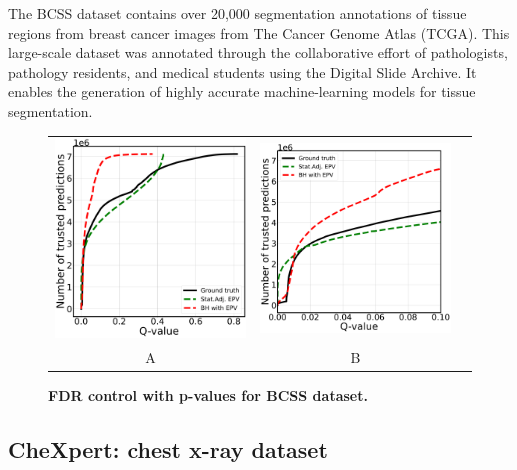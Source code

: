 \documentclass{article}
\begin{document}
The BCSS dataset contains over 20,000 segmentation annotations of tissue regions from breast cancer images from The Cancer Genome Atlas (TCGA). This large-scale dataset was annotated through the collaborative effort of pathologists, pathology residents, and medical students using the Digital Slide Archive. It enables the generation of highly accurate machine-learning models for tissue segmentation.


\begin{figure}
	\centering
	\begin{tabular}{ccc}
 		\includegraphics[width=2in]{img/cnn_multi_sa_bcss_fdr_control.pdf} &
		\includegraphics[width=2in]{img/cnn_multi_sa_bcss_fdr_control_loc.pdf}  \\
		A & B 
	\end{tabular}
	\caption{\bf FDR control with p-values for BCSS dataset.}
	\label{fig:bcss}
\end{figure}



\subsection{CheXpert: chest x-ray dataset}
\end{document}
